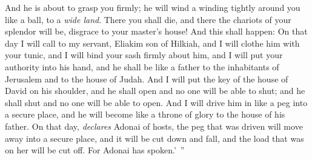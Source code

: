 \begin{biblechapter}
And he is about to grasp you firmly;
\verse he will wind a winding tightly around you like a ball, to a \textit{wide land}. 
There you shall die, 
and there the chariots of your splendor will be, 
disgrace to your master’s house!
\verse And this shall happen:
\verse On that day I will call to my servant, Eliakim son of Hilkiah,
\verse and I will clothe him with your tunic, 
and I will bind your sash firmly about him, 
and I will put your authority into his hand, 
and he shall be like a father to the inhabitants of Jerusalem 
and to the house of Judah.
\verse And I will put the key of the house of David on his shoulder, 
and he shall open and no one will be able to shut; 
and he shall shut and no one will be able to open.
\verse And I will drive him in like a peg into a secure place, 
and he will become like a throne of glory to the house of his father.
\verse On that day, \textit{declares} Adonai of hosts, the peg that was driven will move away into a secure place, and it will be cut down and fall, and the load that was on her will be cut off. For Adonai has spoken.’ ”
\end{biblechapter}

